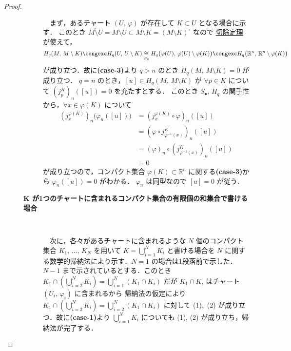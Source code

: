 \documentclass[algtopo_main]{subfiles}
\begin{document}
\begin{proof}
\begin{description}
\begin{description}
            　まず，あるチャート $(U,\, \varphi)$ が存在して $K \subset U$ となる場合に示す．
            このとき
            $\overline{M\setminus U} = M\setminus U \subset M\setminus K = (M\setminus K)^\circ$ なので
            \hyperref[thm:exc]{切除定理}が使えて，
            \begin{align}
                H_q(M,\, M\setminus K) \congexc H_q (U,\, U \setminus K) \underset{\varphi_q}{\cong} H_q \bigl( \varphi(U),\, \varphi(U) \setminus \varphi(K) \bigr) \congexc H_q \bigl( \mathbb{R}^n,\, \mathbb{R}^n \setminus \varphi(K) \bigr) 
            \end{align}
            が成り立つ．故に\textbf{\textsf{(case-3)}}より
            $q > n$ のとき $H_q(M,\, M\setminus K) = 0$ が成り立つ．
            $q=n$ のとき，$[u] \in H_q (M,\, M \setminus K)$ が $\forall p \in K$ について $(j_p^K)_n ([u]) = 0$ を充たすとする．
            このとき $S_\bullet,\, H_q$ の関手性から，$\forall x \in \varphi(K)$ について
            \begin{align}
                (j_x^{\varphi(K)})_n \bigl( \varphi_n ([u])\bigr) &= (j_x^{\varphi(K)} \circ \varphi)_n ([u]) \\
                &= (\varphi \circ j_{\varphi^{-1}(x)}^K)_n ([u]) \\
                &= (\varphi)_n\circ (j_{\varphi^{-1}(x)}^K)_n([u]) \\
                &= 0
            \end{align}
            が成り立つので，コンパクト集合 $\varphi(K) \subset \mathbb{R}^n$ に関する\textbf{\textsf{(case-3)}}から $\varphi_n([u]) = 0$ がわかる．
            $\varphi_n$ は同型なので $[u]=0$ が従う．

            \item[\textbf{$\bm{K}$ が1つのチャートに含まれるコンパクト集合の有限個の和集合で書ける場合}] 　
            
            　次に，各々があるチャートに含まれるような $N$ 個のコンパクト集合 $K_1,\,  \dots ,\, K_N$ を用いて $K = \bigcup_{i=1}^N K_i$ と書ける場合を $N$ に関する数学的帰納法により示す．$N=1$ の場合は1段落前で示した．
            $N-1$ まで示されているとする．このとき $K_1 \cap \left( \bigcup_{i=2}^N K_i \right) = \bigcup_{i=1}^N (K_1 \cap K_i)$ だが $K_1 \cap K_i$ はチャート $(U_i,\, \varphi_i)$ に含まれるから
            帰納法の仮定により $K_1 \cap \left( \bigcup_{i=2}^N K_i \right) = \bigcup_{i=2}^N (K_1 \cap K_i)$ に対して (1),\, (2) が成り立つ．故に\textbf{\textsf{(case-1)}}より $\bigcup_{i=1}^N K_i$ についても (1), (2) が成り立ち，帰納法が完了する．


\end{description}
\end{description}
\end{proof}
\end{document}

